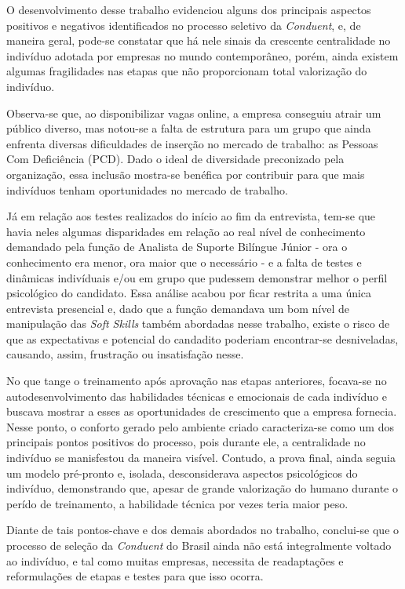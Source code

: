 \documentclass[12pt]{article}
\begin{document}
O desenvolvimento desse trabalho evidenciou alguns dos principais aspectos positivos e negativos identificados no processo seletivo da \emph{Conduent}, e, de maneira geral, pode-se constatar que há nele sinais da crescente centralidade no indivíduo adotada por empresas no mundo contemporâneo, porém, ainda existem algumas fragilidades nas etapas que não proporcionam total valorização do indivíduo.

Observa-se que, ao disponibilizar vagas online, a empresa conseguiu atrair um público diverso, mas notou-se a falta de estrutura para um grupo que ainda enfrenta diversas dificuldades de inserção no mercado de trabalho: as Pessoas Com Deficiência (PCD). Dado o ideal de diversidade preconizado pela organização, essa inclusão mostra-se benéfica por contribuir para que mais indivíduos tenham oportunidades no mercado de trabalho. 

Já em relação aos testes realizados do início ao fim da entrevista, tem-se que havia neles algumas disparidades em relação ao real nível de conhecimento demandado pela função de Analista de Suporte Bilíngue Júnior - ora o conhecimento era menor, ora maior que o necessário - e a falta de testes e dinâmicas indivíduais e/ou em grupo que pudessem demonstrar melhor o perfil psicológico do candidato. Essa análise acabou por ficar restrita a uma única entrevista presencial e, dado que a função demandava um bom nível de manipulação das \emph{Soft Skills} também abordadas nesse trabalho, existe o risco de que as expectativas e potencial do candadito poderiam encontrar-se desniveladas, causando, assim, frustração ou insatisfação nesse.

No que tange o treinamento após aprovação nas etapas anteriores, focava-se no autodesenvolvimento das habilidades técnicas e emocionais de cada indivíduo e buscava mostrar a esses as oportunidades de crescimento que a empresa fornecia. Nesse ponto, o conforto gerado pelo ambiente criado caracteriza-se como um dos principais pontos positivos do processo, pois durante ele, a centralidade no indivíduo se manisfestou da maneira visível. Contudo, a prova final, ainda seguia um modelo pré-pronto e, isolada, desconsiderava aspectos psicológicos do indivíduo, demonstrando que, apesar de grande valorização do humano durante o perído de treinamento, a habilidade técnica por vezes teria maior peso. 

Diante de tais pontos-chave e dos demais abordados no trabalho, conclui-se que o processo de seleção da  \emph{Conduent} do Brasil ainda não está integralmente voltado ao indivíduo, e tal como muitas empresas, necessita de readaptações e reformulações de etapas e testes para que isso ocorra. 
\end{document}
